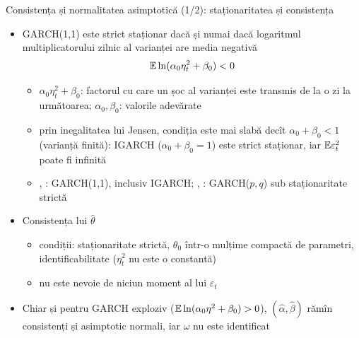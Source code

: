 \begin{frame}{Consistența și normalitatea asimptotică (1/2): staționaritatea și consistența}
\itemsize{\small}
\begin{itemize}
    \item GARCH(1,1) este strict staționar dacă și numai dacă logaritmul multiplicatorului zilnic al varianței are media negativă
    \[ \mathbb{E}\ln(\alpha_0\eta_t^2 + \beta_0) < 0 \]
    \begin{itemize}
        \item $\alpha_0\eta_t^2 + \beta_0$: factorul cu care un șoc al varianței este transmis de la o zi la următoarea; $\alpha_0, \beta_0$: valorile adevărate
        \item prin inegalitatea lui Jensen, condiția este mai slabă decît $\alpha_0 + \beta_0 < 1$ (varianță finită): IGARCH ($\alpha_0 + \beta_0 = 1$) este strict staționar, iar $\mathbb{E}\varepsilon_t^2$ poate fi infinită
        \item {}, : GARCH(1,1), inclusiv IGARCH; , : GARCH($p,q$) sub staționaritate strictă
    \end{itemize}
    \item Consistența lui $\hat\theta$ 
    \begin{itemize}
        \item condiții: staționaritate strictă, $\theta_0$ într-o mulțime compactă de parametri, identificabilitate ($\eta_t^2$ nu este o constantă)
        \item nu este nevoie de niciun moment al lui $\varepsilon_t$
    \end{itemize}
    \item Chiar și pentru GARCH exploziv ($\mathbb{E}\ln(\alpha_0\eta^2 + \beta_0) > 0$), $(\hat\alpha, \hat\beta)$ rămîn consistenți și asimptotic normali, iar $\omega$ nu este identificat 
\end{itemize}
\end{frame}

